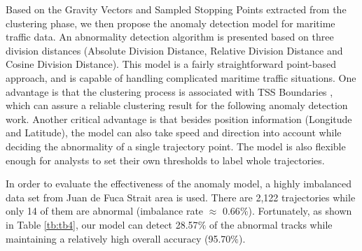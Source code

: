 \documentclass[12pt,glossary]{dalcsthesis}
\begin{document}
Based on the Gravity Vectors and Sampled Stopping Points extracted from the clustering phase, we then propose the anomaly detection model for maritime traffic data. An abnormality detection algorithm is presented based on three division distances (Absolute Division Distance, Relative Division Distance and Cosine Division Distance). This model is a fairly straightforward point-based approach, and is capable of handling complicated maritime traffic situations. One advantage is that the clustering process is associated with TSS Boundaries \cite{tss}, which can assure a reliable clustering result for the following anomaly detection work. Another critical advantage is that besides position information (Longitude and Latitude), the model can also take speed and direction into account while deciding the abnormality of a single trajectory point. The model is also flexible enough for analysts to set their own thresholds to label whole trajectories. 

In order to evaluate the effectiveness of the anomaly model, a highly imbalanced data set from Juan de Fuca Strait area is used. There are 2,122 trajectories while only 14 of them are abnormal (imbalance rate $\approx$ 0.66$\%$). Fortunately, as shown in Table \ref{tb:tb4}, our model can detect 28.57$\%$ of the abnormal tracks while maintaining a relatively high overall accuracy (95.70$\%$).





\end{document}
